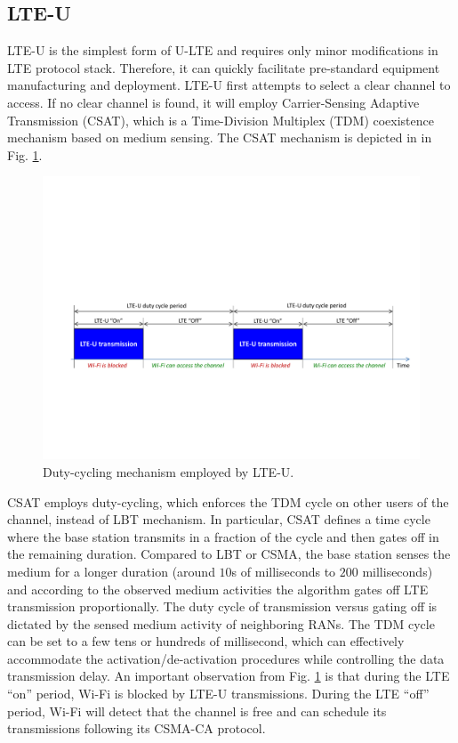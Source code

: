 \subsection{LTE-U}
LTE-U is the simplest form of U-LTE and requires only minor modifications in LTE protocol stack. Therefore, it can quickly facilitate pre-standard equipment manufacturing and deployment. LTE-U first attempts to select a clear channel to access. If no clear channel is found, it will employ Carrier-Sensing Adaptive Transmission (CSAT), which is a Time-Division Multiplex (TDM) coexistence mechanism based on medium sensing. The CSAT mechanism is depicted in in Fig. \ref{figs:LTE-U}.
\begin{figure}[!ht]
	\centering
	\includegraphics[width=\textwidth]{figs/LTE-U}
	\caption{Duty-cycling mechanism employed by LTE-U.}
	\label{figs:LTE-U}
\end{figure}
CSAT employs duty-cycling, which enforces the TDM cycle on other users of the channel, instead of LBT mechanism.  In particular, CSAT defines a time cycle where the base station transmits in a fraction of the cycle and then gates off in the remaining duration. Compared to LBT or CSMA, the base station senses the medium for a longer duration (around $10$s of milliseconds to $200$ milliseconds) and according to the observed medium activities the algorithm gates off LTE transmission proportionally.  The duty cycle of transmission versus gating off is dictated by the sensed medium activity of neighboring RANs. The TDM cycle can be set to a few tens or hundreds of millisecond, which can effectively accommodate the activation/de-activation procedures while controlling the data transmission delay. An important observation from Fig. \ref{figs:LTE-U} is that during the LTE ``on'' period, Wi-Fi is blocked by LTE-U transmissions. During the LTE ``off'' period, Wi-Fi will detect that the channel is free and can schedule its transmissions following its CSMA-CA protocol.

